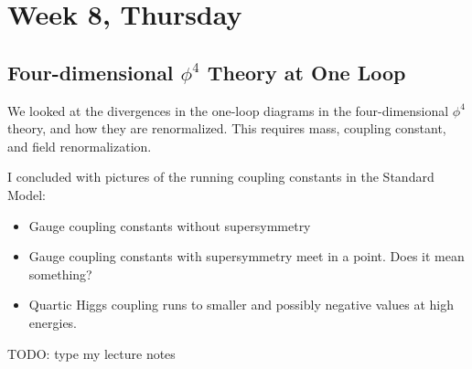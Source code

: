 \documentclass[12pt]{article}
\begin{document}
\section{Week 8, Thursday}

\subsection{Four-dimensional $\phi^4$ Theory at One Loop}

We looked at the divergences in the one-loop diagrams in the
four-dimensional $\phi^4$ theory, and how they are renormalized. This
requires mass, coupling constant, and field renormalization.

I concluded with pictures of the running coupling constants in the
Standard Model:
\begin{itemize}
\item Gauge coupling constants without supersymmetry
\item Gauge coupling constants with supersymmetry meet in a
  point. Does it mean something?
\item Quartic Higgs coupling runs to smaller and possibly negative
  values at high energies.
\end{itemize}

TODO: type my lecture notes


\newpage
\appendix




 
\renewcommand{\refname}{Bibliography}

\end{document}
